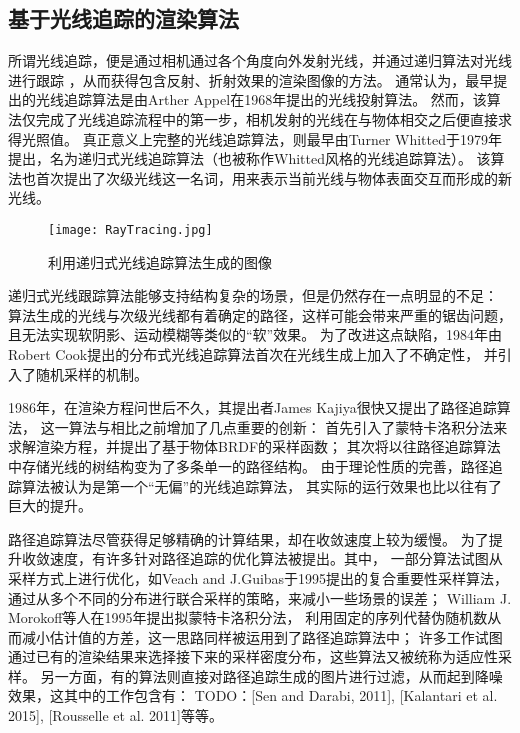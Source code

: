 \subsection{基于光线追踪的渲染算法}

所谓光线追踪，便是通过相机通过各个角度向外发射光线，并通过递归算法对光线进行跟踪
，从而获得包含反射、折射效果的渲染图像的方法。
通常认为，最早提出的光线追踪算法是由Arther Appel在1968年提出的光线投射算法\cite{RayCasting}。
然而，该算法仅完成了光线追踪流程中的第一步，相机发射的光线在与物体相交之后便直接求得光照值。
真正意义上完整的光线追踪算法，则最早由Turner Whitted于1979年提出，名为递归式光线追踪算法\cite{WhittedRayTracing}（也被称作Whitted风格的光线追踪算法）。
该算法也首次提出了次级光线这一名词，用来表示当前光线与物体表面交互而形成的新光线。

\begin{figure}[h]
    \centering
    \texttt{[image: RayTracing.jpg]}
    \caption{利用递归式光线追踪算法生成的图像}
    \label{tab:rayTrace}
\end{figure}

递归式光线跟踪算法能够支持结构复杂的场景，但是仍然存在一点明显的不足：
算法生成的光线与次级光线都有着确定的路径，这样可能会带来严重的锯齿问题，
且无法实现软阴影、运动模糊等类似的“软”效果。
为了改进这点缺陷，1984年由Robert Cook提出的分布式光线追踪算法\cite{DistributiveRayTracing}首次在光线生成上加入了不确定性，
并引入了随机采样的机制。

1986年，在渲染方程问世后不久，其提出者James Kajiya很快又提出了路径追踪算法\cite{PathTracing}，
这一算法与相比之前增加了几点重要的创新：
首先引入了蒙特卡洛积分法来求解渲染方程，并提出了基于物体BRDF的采样函数；
其次将以往路径追踪算法中存储光线的树结构变为了多条单一的路径结构。
由于理论性质的完善，路径追踪算法被认为是第一个“无偏”的光线追踪算法，
其实际的运行效果也比以往有了巨大的提升。

\label{PathTracingOptimization}
路径追踪算法尽管获得足够精确的计算结果，却在收敛速度上较为缓慢。
为了提升收敛速度，有许多针对路径追踪的优化算法被提出。其中，
一部分算法试图从采样方式上进行优化，如Veach and J.Guibas于1995提出的复合重要性采样\cite{MultipleImportanceSampling}算法，
通过从多个不同的分布进行联合采样的策略，来减小一些场景的误差；
William J. Morokoff等人在1995年提出拟蒙特卡洛积分法\cite{QuasiMonteCarlo}，
利用固定的序列代替伪随机数从而减小估计值的方差，这一思路同样被运用到了路径追踪算法中；
许多工作\cite{Belcour2013}\cite{AdaptiveSampling}试图通过已有的渲染结果来选择接下来的采样密度分布，这些算法又被统称为适应性采样。
另一方面，有的算法则直接对路径追踪生成的图片进行过滤，从而起到降噪效果，这其中的工作包含有：
TODO：[Sen and Darabi, 2011], [Kalantari et al. 2015], [Rousselle et al. 2011]等等。

